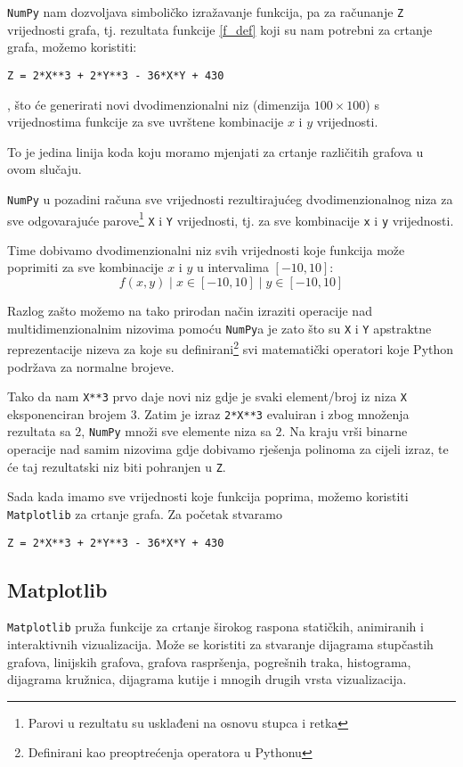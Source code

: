 \verb|NumPy| nam dozvoljava simboličko izražavanje funkcija,
pa za računanje \verb|Z| vrijednosti grafa, tj. rezultata funkcije \eqref{f_def} koji su nam
potrebni za crtanje grafa, možemo koristiti:
\begin{verbatim}
Z = 2*X**3 + 2*Y**3 - 36*X*Y + 430
\end{verbatim}
, što će generirati novi dvodimenzionalni niz (dimenzija $100\times100$) s vrijednostima
funkcije  za sve uvrštene kombinacije $x$ i $y$ vrijednosti.\par
To je jedina linija koda koju moramo mjenjati za crtanje različitih grafova u ovom slučaju.\par
\verb|NumPy| u pozadini računa sve vrijednosti rezultirajućeg dvodimenzionalnog niza za sve odgovarajuće
parove\footnote{Parovi u rezultatu su usklađeni na osnovu stupca i retka} \verb|X| i \verb|Y| vrijednosti,
tj. za sve kombinacije \verb|x| i \verb|y| vrijednosti.

Time dobivamo dvodimenzionalni niz svih vrijednosti koje funkcija može poprimiti za sve kombinacije $x$ i $y$ u intervalima $[-10, 10]$:
$$
{{f(x,y) \mid x \in [-10, 10]} \mid y \in [-10, 10]}
$$

Razlog zašto možemo na tako prirodan način izraziti operacije nad multidimenzionalnim nizovima pomoću \verb|NumPy|a je zato što su
\verb|X| i \verb|Y| apstraktne reprezentacije nizeva za koje su definirani\footnote{Definirani kao preoptrećenja operatora u Pythonu} svi matematički operatori koje Python podržava za normalne brojeve.\par
Tako da nam \verb|X**3| prvo daje novi niz gdje je svaki element/broj iz niza \verb|X| eksponenciran brojem $3$.
Zatim je izraz \verb|2*X**3| evaluiran i zbog množenja rezultata sa $2$, \verb|NumPy| množi sve elemente niza sa $2$.
Na kraju vrši binarne operacije nad samim nizovima gdje dobivamo rješenja polinoma za cijeli izraz, te će taj rezultatski niz biti pohranjen u \verb|Z|.

Sada kada imamo sve vrijednosti koje funkcija poprima, možemo koristiti \verb|Matplotlib| za crtanje grafa. Za početak stvaramo 
\begin{verbatim}
Z = 2*X**3 + 2*Y**3 - 36*X*Y + 430
\end{verbatim}

\subsection{Matplotlib}

\verb|Matplotlib| pruža funkcije za crtanje širokog raspona statičkih, animiranih i interaktivnih vizualizacija.
Može se koristiti za stvaranje dijagrama stupčastih grafova, linijskih grafova, grafova raspršenja, pogrešnih traka,
histograma, dijagrama kružnica, dijagrama kutije i mnogih drugih vrsta vizualizacija.


